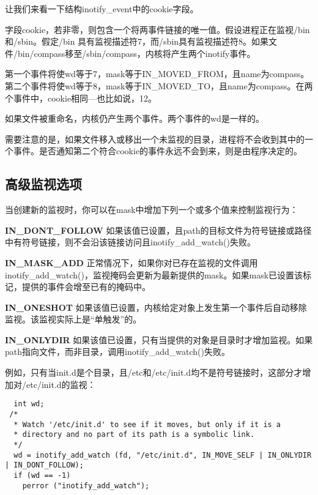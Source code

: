 让我们来看一下结构inotify\_event中的cookie字段。

字段cookie，若非零，则包含一个将两事件链接的唯一值。假设进程正在监视/bin和/sbin。假定/bin 具有监视描述符7，而/sbin具有监视描述符8。如果文件/bin/compass移至/sbin/compass，内核将产生两个inotify事件。

第一个事件将使wd等于7，mask等于IN\_MOVED\_FROM，且name为compass。第二个事件将使wd等于8，mask等于IN\_MOVED\_TO，且name为compass。在两个事件中，cookie相同—也比如说，12。

如果文件被重命名，内核仍产生两个事件。两个事件的wd是一样的。

需要注意的是，如果文件移入或移出一个未监视的目录，进程将不会收到其中的一个事件。是否通知第二个符合cookie的事件永远不会到来，则是由程序决定的。

\subsection{高级监视选项}

当创建新的监视时，你可以在mask中增加下列一个或多个值来控制监视行为：

\begin{eqlist*}
\item[\textbf{IN\_DONT\_FOLLOW}] 如果该值已设置，且path的目标文件为符号链接或路径中有符号链接，则不会沿该链接访问且inotify\_add\_watch()失败。
\item[\textbf{IN\_MASK\_ADD}] 正常情况下，如果你对已存在监视的文件调用inotify\_add\_watch()，监视掩码会更新为最新提供的mask。如果mask已设置该标记，提供的事件会增至已有的掩码中。
\item[\textbf{IN\_ONESHOT}] 如果该值已设置，内核给定对象上发生第一个事件后自动移除监视。该监视实际上是“单触发”的。
\item[\textbf{IN\_ONLYDIR}] 如果该值已设置，只有当提供的对象是目录时才增加监视。如果path指向文件，而非目录，调用inotify\_add\_watch()失败。
\end{eqlist*}

例如，只有当init.d是个目录，且/etc和/etc/init.d均不是符号链接时，这部分才增加对/etc/init.d的监视：

\begin{lstlisting}
  int wd;
 /*
  * Watch '/etc/init.d' to see if it moves, but only if it is a
  * directory and no part of its path is a symbolic link.
  */
  wd = inotify_add_watch (fd, "/etc/init.d", IN_MOVE_SELF | IN_ONLYDIR | IN_DONT_FOLLOW);
  if (wd == -1)
    perror ("inotify_add_watch");
\end{lstlisting}

